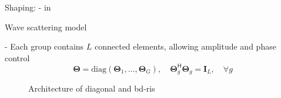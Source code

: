 \documentclass[presentation,xcolor={table},9pt]{beamer}
\begin{document}
\begin{section}{Shaping: - in }
\begin{frame}{Wave scattering model}
		\begin{block}{-}
			Each group contains $L$ connected elements, allowing amplitude and phase control
			\begin{equation*}
				\mathbf{\Theta} = \mathrm{diag}(\mathbf{\Theta}_1,\ldots,\mathbf{\Theta}_G), \quad \mathbf{\Theta}_g^\mathsf{H} \mathbf{\Theta}_g = \mathbf{I}_L, \quad \forall g
				\label{eq:bd_ris}
			\end{equation*}
			\vspace{-0.5cm}
			\begin{figure}[H]
				\centering
				\caption{Architecture of diagonal and \gls{bd}-\gls{ris} \cite{Shen2020a}}
				\label{fg:bd_ris_architecture_2}
			\end{figure}

		\end{block}
	\end{frame}


\end{section}
\end{document}
